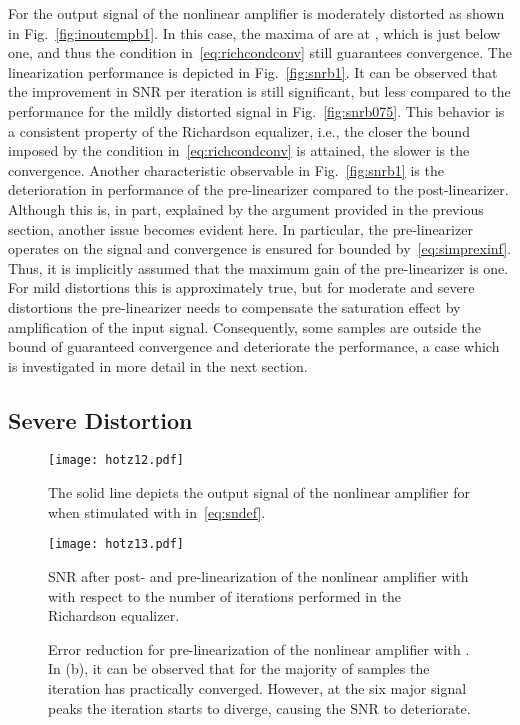 \documentclass[10pt,twocolumn,twoside]{IEEEtran}
\begin{document}
For  the output signal of the nonlinear amplifier is moderately
distorted as shown in Fig.~\ref{fig:inoutcmpb1}. In this case, the maxima
of  are at , which is just below one, and thus the
condition in~\eqref{eq:richcondconv} still guarantees convergence.
The linearization performance is depicted in Fig.~\ref{fig:snrb1}.
It can be observed that the improvement in SNR per iteration is still significant, but less compared to
the performance for the mildly distorted signal in Fig.~\ref{fig:snrb075}. This
behavior is a consistent property of the Richardson equalizer, i.e., the
closer the bound imposed by the condition in~\eqref{eq:richcondconv}
is attained, the slower is the convergence.
Another characteristic observable in Fig.~\ref{fig:snrb1} is the deterioration in performance of
the pre-linearizer compared to the post-linearizer. Although this is, in part, explained by the
argument provided in the previous section, another issue becomes
evident here. In particular, the pre-linearizer operates on the signal 
and convergence is ensured for  bounded by~\eqref{eq:simprexinf}.
Thus, it is implicitly assumed that the maximum gain of the pre-linearizer is
one. For mild distortions this is approximately true, but for moderate and severe distortions
the pre-linearizer needs to compensate the saturation effect by amplification of the
input signal. Consequently, some samples are outside the bound of guaranteed convergence
and deteriorate the performance, a case which is investigated in more detail in the next section.

\subsection{Severe Distortion}

\begin{figure}[!t]\centering \texttt{[image: hotz12.pdf]}\caption{The solid line depicts the output signal of the nonlinear
	amplifier for  when stimulated with  in~\eqref{eq:sndef}.}\label{fig:inoutcmpb130}\end{figure}\begin{figure}[!t]\centering \texttt{[image: hotz13.pdf]}\caption{SNR after post- and pre-linearization of the nonlinear amplifier with 
	with respect to the number of iterations performed in the Richardson equalizer.}\label{fig:snrb130}\end{figure}
\begin{figure}[!t]\centering {}\hfil {}\caption{Error reduction for pre-linearization of the nonlinear amplifier with .
	In (b), it can be observed that for the majority of samples the iteration has
	practically converged. However, at the six major signal peaks the iteration
	starts to diverge, causing the SNR to deteriorate.}\label{fig:errorreductionpreb130}\end{figure}
\end{document}
